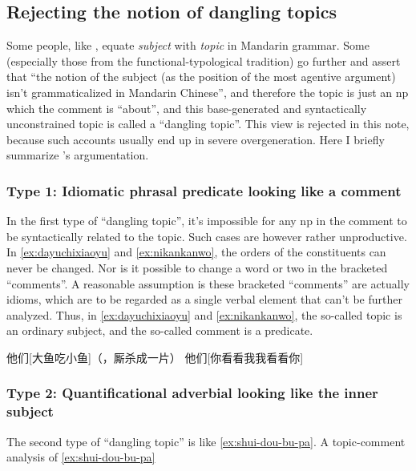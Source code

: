 \documentclass[UTF8, a4paper, oneside, scheme=plain]{ctexrep}
\newcommand*{\citesec}[1]{\S~{#1}}
\newcommand*{\term}[1]{\emph{#1}}
\begin{document}
\subsection{Rejecting the notion of dangling topics}\label{sec:topic-subject}

Some people, like \citet[\citesec{7.1}]{zhudexigrammar},
equate \term{subject} with \term{topic} in Mandarin grammar.
Some (especially those from the functional-typological tradition) go further 
and assert that ``the notion of the subject (as the position of the most agentive argument) 
isn't grammaticalized in Mandarin Chinese'',
and therefore the topic is just an \acs{np} which the comment is ``about'',
and this base-generated and syntactically unconstrained topic 
is called a ``dangling topic''.
This view is rejected in this note,
because such accounts usually end up in severe overgeneration. 
Here I briefly summarize \citet{sih2000topic}'s argumentation.

\subsubsection{Type 1: Idiomatic phrasal predicate looking like a comment} 

In the first type of ``dangling topic'',
it's impossible for any \acs{np} in the comment to be syntactically related to the topic.
Such cases are however rather unproductive. 
In \eqref{ex:dayuchixiaoyu} and \eqref{ex:nikankanwo},
the orders of the constituents can never be changed.
Nor is it possible to change a word or two in the bracketed ``comments''.
A reasonable assumption is these bracketed ``comments''
are actually idioms, 
which are to be regarded as a single verbal element that can't be further analyzed.
Thus, in \eqref{ex:dayuchixiaoyu} and \eqref{ex:nikankanwo},
the so-called topic is an ordinary subject,
and the so-called comment is a predicate.

\begin{exe}
    \ex\label{ex:dayuchixiaoyu} 他们[大鱼吃小鱼]（，厮杀成一片）
    \ex\label{ex:nikankanwo} 他们[你看看我我看看你]
\end{exe}

\subsubsection{Type 2: Quantificational adverbial looking like the inner subject}

The second type of ``dangling topic'' is like \eqref{ex:shui-dou-bu-pa}.
A topic-comment analysis of \eqref{ex:shui-dou-bu-pa} 
\end{document}
